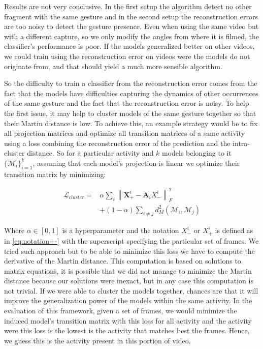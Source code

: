 \documentclass[twocolumn,10pt]{asme2ej}
\newcommand{\norm}[1]{\left\lVert#1\right\rVert}
\begin{document}
Results are not very conclusive. In the first setup the algorithm detect no other fragment with the same gesture and in the second setup the reconstruction errors are too noisy to detect the gesture presence. Even when using the same video but with a different capture, so we only modify the angles from where it is filmed, the classifier's performance is poor. If the models generalized better on other videos, we could train using the reconstruction error on videos were the models do not originate from, and that should yield a much more sensible algorithm.

So the difficulty to train a classifier from the reconstruction error comes from the fact that the models have difficulties capturing the dynamics of other occurrences of the same gesture and the fact that the reconstruction error is noisy. To help the first issue, it may help to cluster models of the same gesture together so that their Martin distance is low. To achieve this, an example strategy would be to fix all projection matrices and optimize all transition matrices of a same activity using a loss combining the reconstruction error of the prediction and the intra-cluster distance. So for a particular activity and $k$ models belonging to it $\big \{\mathcal{M}_i \big \}_{i=1}^k$, assuming that each model's projection is linear we optimize their transition matrix by minimizing:

\begin{equation}
\begin{split}
    \label{eq:clusterloss1}
        \mathcal{L}_{cluster} = & \alpha \sum_{i}\norm{\bm X_+^i - \bm A_i X_-^i}_F^2  \\
                            & + (1-\alpha)\sum_{i\neq j}d_M^2(\mathcal{M}_i, \mathcal{M}_j)
\end{split}
\end{equation}

Where $\alpha \in [0,1]$ is a hyperparameter and the notation $X_-^i$ or $X_+^i$ is defined as in \eqref{eq:notation+-} with the superscript specifying the particular set of frames. We tried such approach but to be able to minimize this loss we have to compute the derivative of the Martin distance. This computation is based on solutions to matrix equations, it is possible that we did not manage to minimize the Martin distance because our solutions were inexact, but in any case this computation is not trivial. If we were able to cluster the models together, chances are that it will improve the generalization power of the models within the same activity. In the evaluation of this framework, given a set of frames, we would minimize the induced model's transition matrix with this loss for all activity and the activity were this loss is the lowest is the activity that matches best the frames. Hence, we guess this is the activity present in this portion of video.
\end{document}
